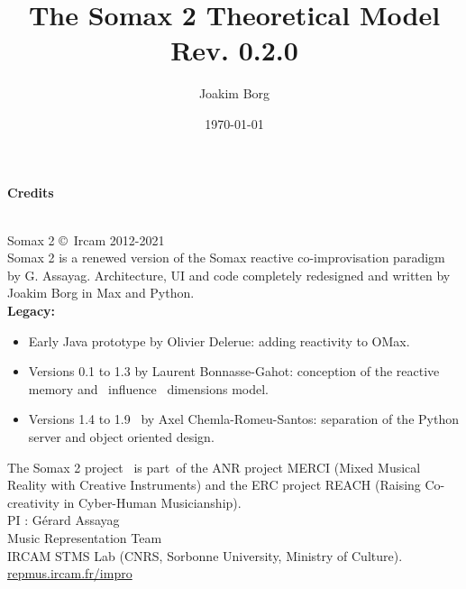 \documentclass[10pt]{report}
\title{The Somax 2 Theoretical Model\\[0.24cm]
	\large{Rev. 0.2.0}}
\author{Joakim Borg}
\date{\today}
\begin{document}
\maketitle
\chapter*{}
\large{\textbf{Credits}\\}\\
\small{
Somax 2 \copyright \ Ircam 2012-2021\\

\noindent Somax 2 is a renewed version of the Somax reactive co-improvisation paradigm by G. Assayag.
Architecture, UI and code completely redesigned and written by Joakim Borg in Max and Python.
\\

\noindent \textbf{Legacy:}
\begin{itemize}
\item Early Java prototype by Olivier Delerue: adding reactivity to OMax.
\item Versions 0.1 to 1.3 by Laurent Bonnasse-Gahot: conception of the reactive memory and  influence  dimensions model.
\item Versions 1.4 to 1.9  by Axel Chemla-Romeu-Santos: separation of the Python server and object oriented design.
\end{itemize}

\medskip
\noindent The Somax 2 project  is part of the ANR project MERCI (Mixed Musical Reality with Creative Instruments) and the ERC project REACH (Raising Co-creativity in Cyber-Human Musicianship).
\\

\noindent PI : Gérard Assayag\\
Music Representation Team\\
IRCAM STMS Lab (CNRS, Sorbonne University, Ministry of Culture).
\\

\noindent\url{repmus.ircam.fr/impro}
}

\tableofcontents









{}

\end{document}
